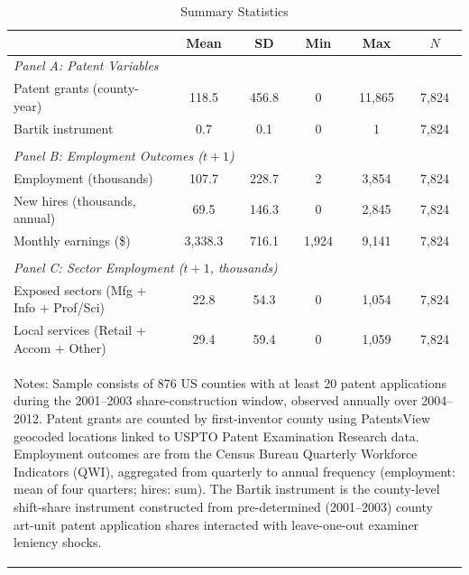 \begin{table}[htbp]
\centering
\caption{Summary Statistics}
\label{tab:sumstat}
\begin{tabular}{lccccc}
\hline\hline
 & Mean & SD & Min & Max & $N$ \\
\hline
\multicolumn{6}{l}{\textit{Panel A: Patent Variables}} \\[3pt]
Patent grants (county-year)                   & 118.5 & 456.8 & 0 & 11,865 & 7,824 \\
Bartik instrument                             & 0.7 & 0.1 & 0 & 1 & 7,824 \\
\\[6pt]
\multicolumn{6}{l}{\textit{Panel B: Employment Outcomes ($t+1$)}} \\[3pt]
Employment (thousands)                        & 107.7 & 228.7 & 2 & 3,854 & 7,824 \\
New hires (thousands, annual)                 & 69.5 & 146.3 & 0 & 2,845 & 7,824 \\
Monthly earnings (\$)                         & 3,338.3 & 716.1 & 1,924 & 9,141 & 7,824 \\
\\[6pt]
\multicolumn{6}{l}{\textit{Panel C: Sector Employment ($t+1$, thousands)}} \\[3pt]
Exposed sectors (Mfg + Info + Prof/Sci)       & 22.8 & 54.3 & 0 & 1,054 & 7,824 \\
Local services (Retail + Accom + Other)       & 29.4 & 59.4 & 0 & 1,059 & 7,824 \\
\hline\hline
\multicolumn{6}{p{0.95\textwidth}}{\begin{flushleft}\small
Notes: Sample consists of 876 US counties with at least 20 patent applications during the 2001--2003 share-construction window, observed annually over 2004--2012. Patent grants are counted by first-inventor county using PatentsView geocoded locations linked to USPTO Patent Examination Research data. Employment outcomes are from the Census Bureau Quarterly Workforce Indicators (QWI), aggregated from quarterly to annual frequency (employment: mean of four quarters; hires: sum). The Bartik instrument is the county-level shift-share instrument constructed from pre-determined (2001--2003) county art-unit patent application shares interacted with leave-one-out examiner leniency shocks.
\end{flushleft}}
\end{tabular}
\end{table}
